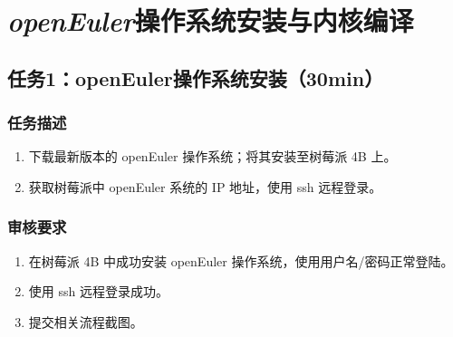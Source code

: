 \documentclass{article}
\begin{document}
\setcounter{page}{1}
\pagestyle{headings}

\section{\textit{openEuler}操作系统安装与内核编译}

\subsection{任务1：openEuler操作系统安装（30min）}
\subsubsection{任务描述}
\begin{enumerate}
    \item 下载最新版本的 openEuler 操作系统；将其安装至树莓派 4B 上。
    \item 获取树莓派中 openEuler 系统的 IP 地址，使用 ssh 远程登录。
\end{enumerate}

\subsubsection{审核要求}
\begin{enumerate}
    \item 在树莓派 4B 中成功安装 openEuler 操作系统，使用用户名/密码正常登陆。
    \item 使用 ssh 远程登录成功。
    \item 提交相关流程截图。
\end{enumerate}
\end{document}
